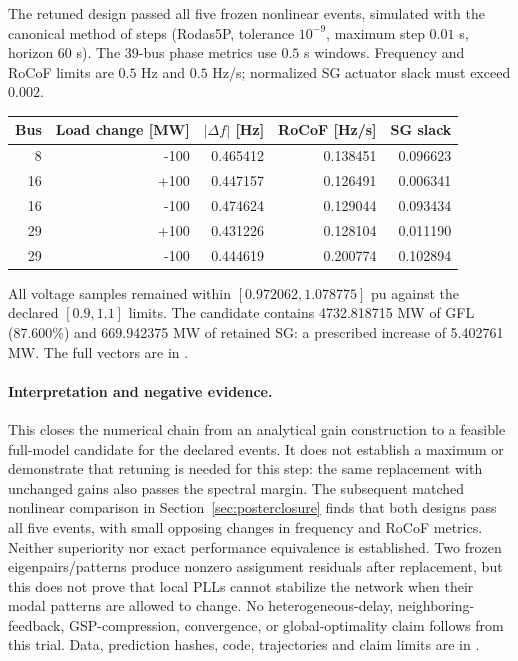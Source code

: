 \documentclass[11pt]{article}
\begin{document}
The retuned design passed all five frozen nonlinear events, simulated
with the canonical method of steps (Rodas5P, tolerance $10^{-9}$,
maximum step $0.01$ s, horizon $60$ s). The 39-bus phase metrics use
$0.5$ s windows. Frequency and RoCoF limits are $0.5$ Hz and
$0.5$ Hz/s; normalized SG actuator slack must exceed $0.002$.
\begin{center}\small
\begin{tabular}{rrrrr}\toprule
Bus & Load change [MW] & $|\Delta f|$ [Hz] & RoCoF [Hz/s] & SG slack\\
\midrule
8 & -100 & 0.465412 & 0.138451 & 0.096623\\
16 & +100 & 0.447157 & 0.126491 & 0.006341\\
16 & -100 & 0.474624 & 0.129044 & 0.093434\\
29 & +100 & 0.431226 & 0.128104 & 0.011190\\
29 & -100 & 0.444619 & 0.200774 & 0.102894\\
\bottomrule\end{tabular}
\end{center}
All voltage samples remained within $[0.972062,1.078775]$ pu
against the declared $[0.9,1.1]$ limits.
The candidate contains 4732.818715 MW of GFL (87.600\%) and
669.942375 MW of retained SG: a prescribed increase of 5.402761 MW.
The full vectors are in
.

\paragraph{Interpretation and negative evidence.}
This closes the numerical chain from an analytical gain construction
to a feasible full-model candidate for the declared events.
It does not establish a maximum or demonstrate that retuning is needed
for this step: the same replacement with unchanged gains also passes
the spectral margin. The subsequent matched nonlinear comparison
in Section~\ref{sec:posterclosure} finds that both designs pass all five
events, with small opposing changes in frequency and RoCoF metrics.
Neither superiority nor exact performance equivalence is established.
Two frozen eigenpairs/patterns produce nonzero assignment residuals
after replacement, but this does not prove that local PLLs cannot
stabilize the network when their modal patterns are allowed to change.
No heterogeneous-delay, neighboring-feedback, GSP-compression,
convergence, or global-optimality claim follows from this trial.
Data, prediction hashes, code, trajectories and claim limits are in
.
\end{document}
